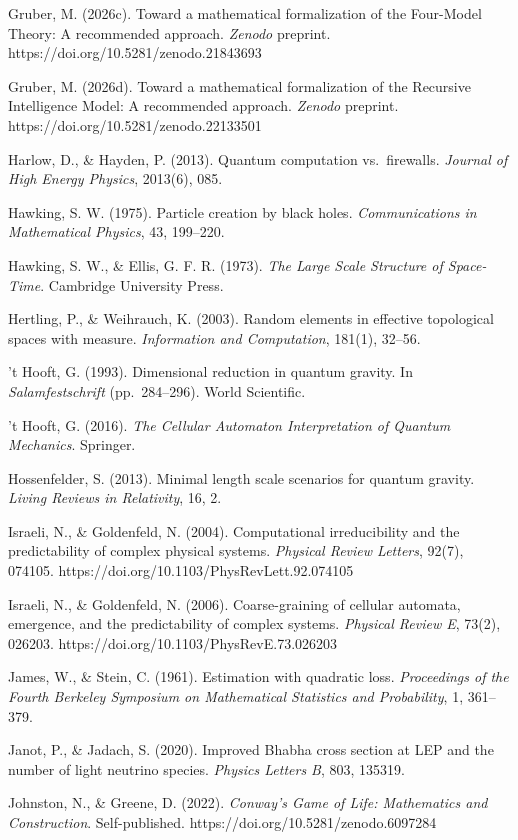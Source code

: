 \documentclass[
]{article}
\begin{document}
Gruber, M. (2026c). Toward a mathematical formalization of the
Four-Model Theory: A recommended approach. \emph{Zenodo} preprint.
https://doi.org/10.5281/zenodo.21843693

Gruber, M. (2026d). Toward a mathematical formalization of the Recursive
Intelligence Model: A recommended approach. \emph{Zenodo} preprint.
https://doi.org/10.5281/zenodo.22133501

Harlow, D., \& Hayden, P. (2013). Quantum computation vs.~firewalls.
\emph{Journal of High Energy Physics}, 2013(6), 085.

Hawking, S. W. (1975). Particle creation by black holes.
\emph{Communications in Mathematical Physics}, 43, 199--220.

Hawking, S. W., \& Ellis, G. F. R. (1973). \emph{The Large Scale
Structure of Space-Time}. Cambridge University Press.

Hertling, P., \& Weihrauch, K. (2003). Random elements in effective
topological spaces with measure. \emph{Information and Computation},
181(1), 32--56.

't Hooft, G. (1993). Dimensional reduction in quantum gravity. In
\emph{Salamfestschrift} (pp.~284--296). World Scientific.

't Hooft, G. (2016). \emph{The Cellular Automaton Interpretation of
Quantum Mechanics}. Springer.

Hossenfelder, S. (2013). Minimal length scale scenarios for quantum
gravity. \emph{Living Reviews in Relativity}, 16, 2.

Israeli, N., \& Goldenfeld, N. (2004). Computational irreducibility and
the predictability of complex physical systems. \emph{Physical Review
Letters}, 92(7), 074105. https://doi.org/10.1103/PhysRevLett.92.074105

Israeli, N., \& Goldenfeld, N. (2006). Coarse-graining of cellular
automata, emergence, and the predictability of complex systems.
\emph{Physical Review E}, 73(2), 026203.
https://doi.org/10.1103/PhysRevE.73.026203

James, W., \& Stein, C. (1961). Estimation with quadratic loss.
\emph{Proceedings of the Fourth Berkeley Symposium on Mathematical
Statistics and Probability}, 1, 361--379.

Janot, P., \& Jadach, S. (2020). Improved Bhabha cross section at LEP
and the number of light neutrino species. \emph{Physics Letters B}, 803,
135319.

Johnston, N., \& Greene, D. (2022). \emph{Conway's Game of Life:
Mathematics and Construction}. Self-published.
https://doi.org/10.5281/zenodo.6097284
\end{document}
